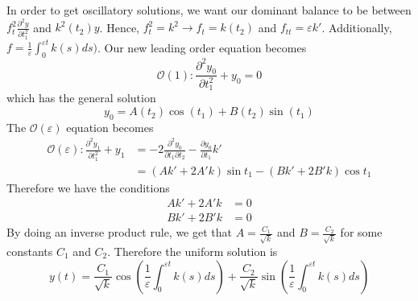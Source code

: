 \documentclass{article}
\newcommand{\pd}[2]{\frac{\partial #1}{\partial #2}}
\begin{document}
In order to get oscillatory solutions, we want our dominant balance to be between $f_t^2 \pd{^2y}{t_1^2}$ and $k^2(t_2) y$. Hence, $f_t^2 =k^2 \to f_t = k(t_2)$ and $f_{tt} = \varepsilon k'$. Additionally, $f=\frac{1}{\varepsilon}\int^{\varepsilon t}_0 k(s)ds)$. Our new leading order equation becomes 
\begin{equation*}
    \mathcal{O}(1): \pd{^2y_0}{t_1^2} + y_0 =0
\end{equation*}
which has the general solution
\begin{equation*}
    y_0 = A(t_2) \cos(t_1) + B(t_2) \sin(t_1)
\end{equation*}
The $\mathcal{O}(\varepsilon)$ equation becomes 
\begin{align*}
    \mathcal{O}(\varepsilon): \pd{^2y_1}{t_1^2} + y_1 &= -2 \pd{^2y_0}{t_1\partial t_2}  - \pd{y_0}{t_1} k'\\
    &= (Ak' + 2A'k)\sin  t_1 - (Bk'+2B'k)\cos t_1
\end{align*}
Therefore we have the conditions 
\begin{align*}
    Ak' + 2A'k &= 0 \\
    Bk' + 2B'k &= 0
\end{align*}
By doing an inverse product rule, we get that $A = \frac{C_1}{\sqrt{k}}$ and $B = \frac{C_2}{\sqrt{k}}$ for some constants $C_1$ and $C_2$. Therefore the uniform solution is 
\begin{equation*}
    y(t) = \frac{C_1}{\sqrt{k}} \cos\left(\frac{1}{\varepsilon}\int^{\varepsilon t}_0 k(s)ds\right) + \frac{C_2}{\sqrt{k}} \sin\left(\frac{1}{\varepsilon}\int^{\varepsilon t}_0 k(s)ds\right)
\end{equation*}
\end{document}
